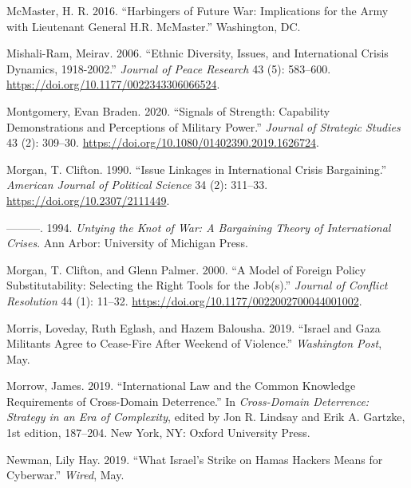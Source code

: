 \documentclass[
]{article}
\begin{document}
\leavevmode\hypertarget{ref-mcmaster_harbingersfuturewar_2016}{}%
McMaster, H. R. 2016. ``Harbingers of Future War: Implications for the Army with Lieutenant General H.R. McMaster.'' Washington, DC.

\leavevmode\hypertarget{ref-mishali-ram_ethnicdiversityissues_2006}{}%
Mishali-Ram, Meirav. 2006. ``Ethnic Diversity, Issues, and International Crisis Dynamics, 1918-2002.'' \emph{Journal of Peace Research} 43 (5): 583--600. \url{https://doi.org/10.1177/0022343306066524}.

\leavevmode\hypertarget{ref-montgomery_signalsstrengthcapability_2020}{}%
Montgomery, Evan Braden. 2020. ``Signals of Strength: Capability Demonstrations and Perceptions of Military Power.'' \emph{Journal of Strategic Studies} 43 (2): 309--30. \url{https://doi.org/10.1080/01402390.2019.1626724}.

\leavevmode\hypertarget{ref-morgan_issuelinkagesinternational_1990}{}%
Morgan, T. Clifton. 1990. ``Issue Linkages in International Crisis Bargaining.'' \emph{American Journal of Political Science} 34 (2): 311--33. \url{https://doi.org/10.2307/2111449}.

\leavevmode\hypertarget{ref-morgan_untyingknotwar_1994}{}%
---------. 1994. \emph{Untying the Knot of War: A Bargaining Theory of International Crises}. Ann Arbor: University of Michigan Press.

\leavevmode\hypertarget{ref-morgan_modelforeignpolicy_2000}{}%
Morgan, T. Clifton, and Glenn Palmer. 2000. ``A Model of Foreign Policy Substitutability: Selecting the Right Tools for the Job(s).'' \emph{Journal of Conflict Resolution} 44 (1): 11--32. \url{https://doi.org/10.1177/0022002700044001002}.

\leavevmode\hypertarget{ref-morris_israelgazamilitants_2019}{}%
Morris, Loveday, Ruth Eglash, and Hazem Balousha. 2019. ``Israel and Gaza Militants Agree to Cease-Fire After Weekend of Violence.'' \emph{Washington Post}, May.

\leavevmode\hypertarget{ref-morrow_internationallawcommon_2019}{}%
Morrow, James. 2019. ``International Law and the Common Knowledge Requirements of Cross-Domain Deterrence.'' In \emph{Cross-Domain Deterrence: Strategy in an Era of Complexity}, edited by Jon R. Lindsay and Erik A. Gartzke, 1st edition, 187--204. New York, NY: Oxford University Press.

\leavevmode\hypertarget{ref-newman_whatisraelstrike_2019}{}%
Newman, Lily Hay. 2019. ``What Israel's Strike on Hamas Hackers Means for Cyberwar.'' \emph{Wired}, May.
\end{document}
